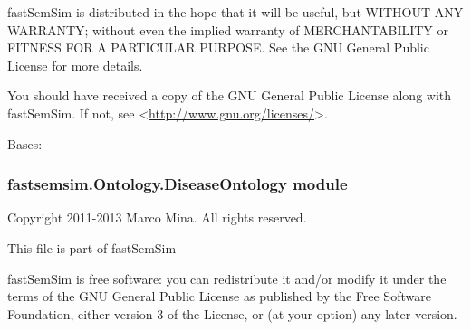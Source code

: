 \documentclass[letterpaper,10pt,english]{sphinxmanual}
\begin{document}
fastSemSim is distributed in the hope that it will be useful,
but WITHOUT ANY WARRANTY; without even the implied warranty of
MERCHANTABILITY or FITNESS FOR A PARTICULAR PURPOSE.  See the
GNU General Public License for more details.

You should have received a copy of the GNU General Public License
along with fastSemSim.  If not, see \textless{}\href{http://www.gnu.org/licenses/}{http://www.gnu.org/licenses/}\textgreater{}.

\begin{fulllineitems}
\label{fastsemsim.Ontology:fastsemsim.Ontology.CellOntology.CellOntology}
Bases: {\hyperref[fastsemsim.Ontology:fastsemsim.Ontology.Ontology.Ontology]{}}

\begin{fulllineitems}
\label{fastsemsim.Ontology:fastsemsim.Ontology.CellOntology.CellOntology.alt_ids}
\end{fulllineitems}


\begin{fulllineitems}
\label{fastsemsim.Ontology:fastsemsim.Ontology.CellOntology.CellOntology.obsolete_ids}
\end{fulllineitems}


\end{fulllineitems}



\subsubsection{fastsemsim.Ontology.DiseaseOntology module}
\label{fastsemsim.Ontology:fastsemsim-ontology-diseaseontology-module}\label{fastsemsim.Ontology:module-fastsemsim.Ontology.DiseaseOntology}
Copyright 2011-2013 Marco Mina. All rights reserved.

This file is part of fastSemSim

fastSemSim is free software: you can redistribute it and/or modify
it under the terms of the GNU General Public License as published by
the Free Software Foundation, either version 3 of the License, or
(at your option) any later version.
\end{document}
